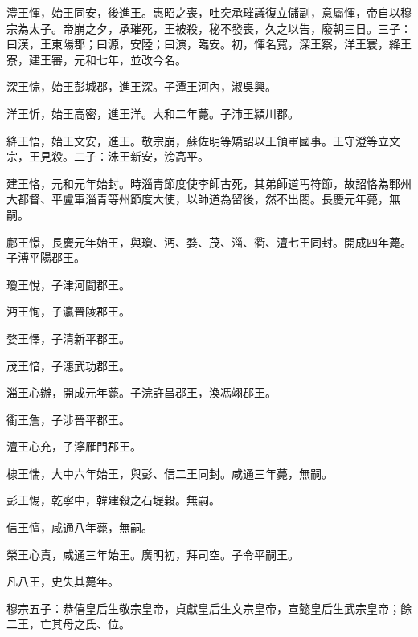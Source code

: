 \begin{pinyinscope}
 澧王惲，始王同安，後進王。惠昭之喪，吐突承璀議復立儲副，意屬惲，帝自以穆宗為太子。帝崩之夕，承璀死，王被殺，秘不發喪，久之以告，廢朝三日。三子：曰漢，王東陽郡；曰源，安陸；曰演，臨安。初，惲名寬，深王察，洋王寰，絳王寮，建王審，元和七年，並改今名。



 深王悰，始王彭城郡，進王深。子潭王河內，淑吳興。



 洋王忻，始王高密，進王洋。大和二年薨。子沛王潁川郡。



 絳王悟，始王文安，進王。敬宗崩，蘇佐明等矯詔以王領軍國事。王守澄等立文宗，王見殺。二子：洙王新安，滂高平。



 建王恪，元和元年始封。時淄青節度使李師古死，其弟師道丐符節，故詔恪為鄆州大都督、平盧軍淄青等州節度大使，以師道為留後，然不出閤。長慶元年薨，無嗣。



 鄜王憬，長慶元年始王，與瓊、沔、婺、茂、淄、衢、澶七王同封。開成四年薨。子溥平陽郡王。



 瓊王悅，子津河間郡王。



 沔王恂，子瀛晉陵郡王。



 婺王懌，子清新平郡王。



 茂王愔，子潓武功郡王。



 淄王心辦，開成元年薨。子浣許昌郡王，渙馮翊郡王。



 衢王詹，子涉晉平郡王。



 澶王心充，子濘雁門郡王。



 棣王惴，大中六年始王，與彭、信二王同封。咸通三年薨，無嗣。



 彭王惕，乾寧中，韓建殺之石堤穀。無嗣。



 信王憻，咸通八年薨，無嗣。



 榮王心責，咸通三年始王。廣明初，拜司空。子令平嗣王。



 凡八王，史失其薨年。



 穆宗五子：恭僖皇后生敬宗皇帝，貞獻皇后生文宗皇帝，宣懿皇后生武宗皇帝；餘二王，亡其母之氏、位。




\end{pinyinscope}
